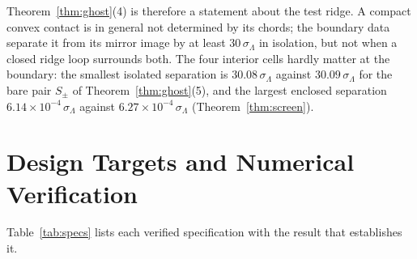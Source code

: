 \documentclass[11pt,a4paper]{article}
\theoremstyle{definition}
\theoremstyle{remark}
\begin{document}
Theorem~\ref{thm:ghost}(4) is therefore a statement about the test ridge. A compact convex contact is in general not determined by its chords; the boundary data separate it from its mirror image by at least $30\,\sigma_\Lambda$ in isolation, but not when a closed ridge loop surrounds both. The four interior cells hardly matter at the boundary: the smallest isolated separation is $30.08\,\sigma_\Lambda$ against $30.09\,\sigma_\Lambda$ for the bare pair $S_\pm$ of Theorem~\ref{thm:ghost}(5), and the largest enclosed separation $6.14\times10^{-4}\,\sigma_\Lambda$ against $6.27\times10^{-4}\,\sigma_\Lambda$ (Theorem~\ref{thm:screen}).

\clearpage
\section{Design Targets and Numerical Verification}
Table~\ref{tab:specs} lists each verified specification with the result that establishes it.
\end{document}
